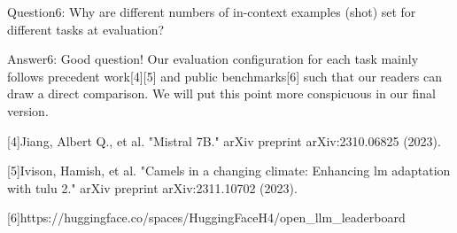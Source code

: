 Question6: Why are different numbers of in-context examples (shot) set for different tasks at evaluation?

Answer6: Good question! Our evaluation configuration for each task mainly follows precedent work[4][5] and public benchmarks[6] such that our readers can draw a direct comparison. We will put this point more conspicuous in our final version. 

[4]Jiang, Albert Q., et al. "Mistral 7B." arXiv preprint arXiv:2310.06825 (2023).

[5]Ivison, Hamish, et al. "Camels in a changing climate: Enhancing lm adaptation with tulu 2." arXiv preprint arXiv:2311.10702 (2023).

[6]https://huggingface.co/spaces/HuggingFaceH4/open_llm_leaderboard
